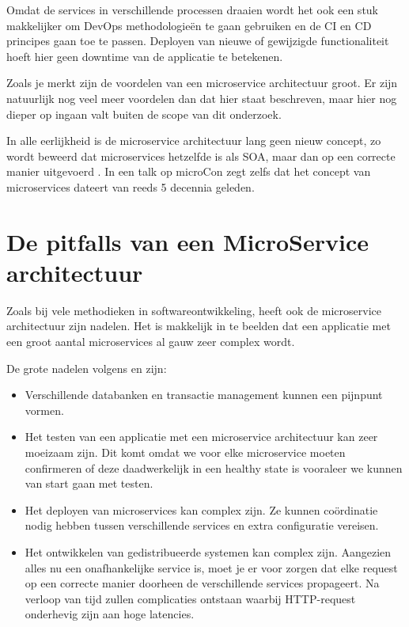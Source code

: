 Omdat de services in verschillende processen draaien wordt het ook een stuk makkelijker om \gls{DevOps} methodologieën te gaan gebruiken en de \gls{CI} en \gls{CD} principes gaan toe te passen. Deployen van nieuwe of gewijzigde functionaliteit hoeft hier geen downtime van de applicatie te betekenen.

Zoals je merkt zijn de voordelen van een microservice architectuur groot. Er zijn natuurlijk nog veel meer voordelen dan dat hier staat beschreven, maar hier nog dieper op ingaan valt buiten de scope van dit onderzoek.

In alle eerlijkheid is de microservice architectuur lang geen nieuw concept, zo  wordt beweerd dat microservices hetzelfde is als \gls{SOA}, maar dan op een correcte manier uitgevoerd \autocite{Morris2014} \autocite{Young2016}. In een talk op microCon zegt \textcite{Young2016} zelfs dat het concept van microservices dateert van reeds 5 decennia geleden.

\section{De pitfalls van een MicroService architectuur}
Zoals bij vele methodieken in softwareontwikkeling, heeft ook de microservice architectuur zijn nadelen. Het is makkelijk in te beelden dat een applicatie met een groot aantal microservices al gauw zeer complex wordt.

De grote nadelen volgens \textcite{Fowler2015} en \textcite{Hummel2018} zijn:

\begin{itemize}
	\item Verschillende databanken en transactie management kunnen een pijnpunt vormen.
	\item Het testen van een applicatie met een microservice architectuur kan zeer moeizaam zijn. Dit komt omdat we voor elke microservice moeten confirmeren of deze daadwerkelijk in een healthy state is vooraleer we kunnen van start gaan met testen.
	\item Het deployen van microservices kan complex zijn. Ze kunnen coördinatie nodig hebben tussen verschillende services en extra configuratie vereisen.
	\item Het ontwikkelen van \gls{gedistribueerde systemen} kan complex zijn. Aangezien alles nu een onafhankelijke service is, moet je er voor zorgen dat elke request op een correcte manier doorheen de verschillende services propageert. Na verloop van tijd zullen complicaties ontstaan waarbij \gls{HTTP-request} onderhevig zijn aan hoge \gls{latencies}.
\end{itemize}

